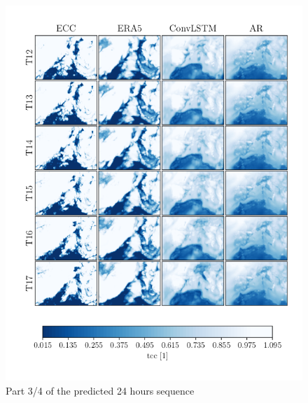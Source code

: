\begin{figure}
    \centering
    \includegraphics{python_figs/comparting_seq_part_3_of4.png}
    \caption{Part 3/4 of the predicted 24 hours sequence }
    \label{fig:part3/4}
\end{figure}
